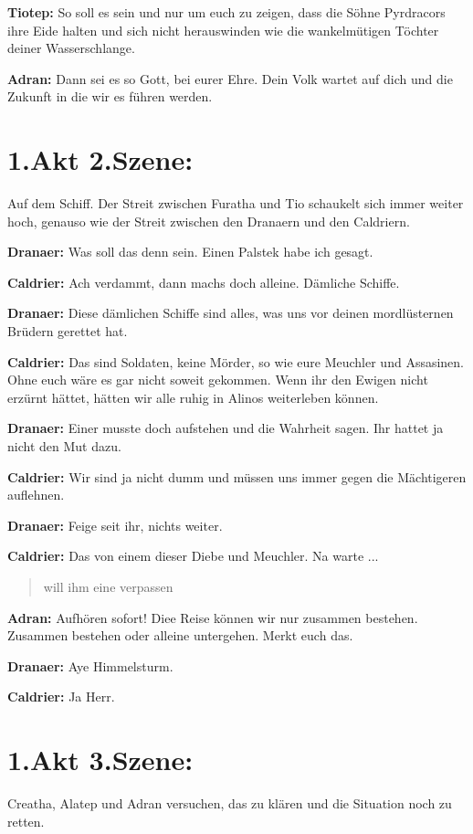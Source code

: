 \documentclass[a5paper,6pt]{book}
\begin{document}
\textbf{Tiotep:} So soll es sein und nur um euch zu zeigen, dass die Söhne Pyrdracors ihre Eide halten
und sich nicht herauswinden wie die wankelmütigen Töchter deiner Wasserschlange.

\textbf{Adran:} Dann sei es so Gott, bei eurer Ehre. Dein Volk wartet auf dich und die Zukunft in die
wir es führen werden.

\section{1.Akt 2.Szene:}

Auf dem Schiff. Der Streit zwischen Furatha und Tio schaukelt sich immer weiter hoch,
genauso wie der Streit zwischen den Dranaern und den Caldriern.

\textbf{Dranaer:} Was soll das denn sein. Einen Palstek habe ich gesagt.

\textbf{Caldrier:} Ach verdammt, dann machs doch alleine. Dämliche Schiffe.

\textbf{Dranaer:} Diese dämlichen Schiffe sind alles, was uns vor deinen mordlüsternen Brüdern
gerettet hat.

\textbf{Caldrier:} Das sind Soldaten, keine Mörder, so wie eure Meuchler und Assasinen. Ohne euch
wäre es gar nicht soweit gekommen. Wenn ihr den Ewigen nicht erzürnt hättet, hätten
wir alle ruhig in Alinos weiterleben können.

\textbf{Dranaer:} Einer musste doch aufstehen und die Wahrheit sagen. Ihr hattet ja nicht den Mut
dazu.

\textbf{Caldrier:} Wir sind ja nicht dumm und müssen uns immer gegen die Mächtigeren auflehnen.

\textbf{Dranaer:} Feige seit ihr, nichts weiter.

\textbf{Caldrier:} Das von einem dieser Diebe und Meuchler. Na warte ...

\begin{quote}
will ihm eine verpassen
\end{quote}

\textbf{Adran:} Aufhören sofort! Diee Reise können wir nur zusammen bestehen. Zusammen
bestehen oder alleine untergehen. Merkt euch das.

\textbf{Dranaer:} Aye Himmelsturm.

\textbf{Caldrier:} Ja Herr.

\section{1.Akt 3.Szene:}
Creatha, Alatep und Adran versuchen, das zu klären und die Situation noch zu retten.
\end{document}
